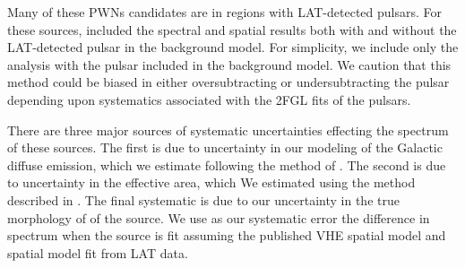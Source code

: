 Many of these \acp{PWN} candidates are in regions with \ac{LAT}-detected
pulsars.  For these sources, \cite{acero_2013a_constraints-galactic}
included the spectral and spatial results both with and without the
\ac{LAT}-detected pulsar in the background model. For simplicity,
we include only the analysis with the pulsar included in the
background model. We caution that this method could be biased in either
oversubtracting or undersubtracting the pulsar depending upon systematics
associated with the \ac{2FGL} fits of the pulsars.

There are three major sources of systematic uncertainties effecting
the spectrum of these sources. The first is due to uncertainty in our
modeling of the Galactic diffuse emission, which we estimate following the
method of .  The second is due to
uncertainty in the effective area, which We estimated using the method
described in \cite{ackermann_2012a_fermi-large}.  The final systematic
is due to our uncertainty in the true morphology of of the source. We
use as our systematic error the difference in spectrum when the source
is fit assuming the published \ac{VHE} spatial model and spatial model
fit from \ac{LAT} data.
